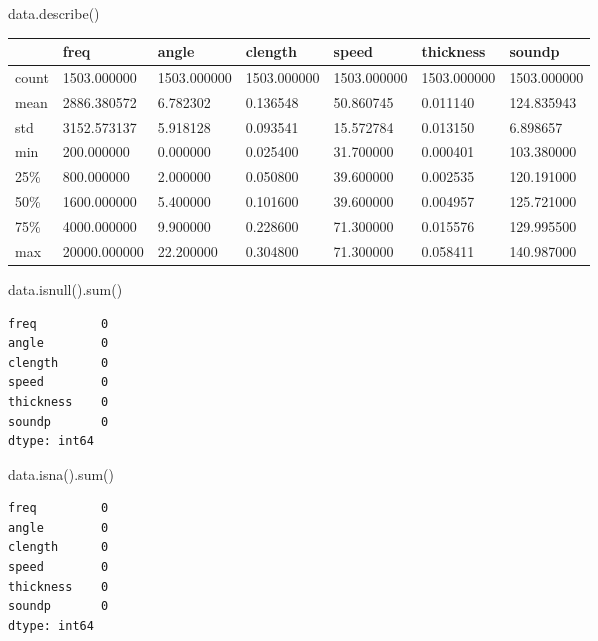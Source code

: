 \documentclass[
  letterpaper,
  DIV=11,
  numbers=noendperiod]{scrartcl}
\newenvironment{Shaded}{\begin{snugshade}}{\end{snugshade}}
\newcommand{\BuiltInTok}[1]{\textcolor[rgb]{0.00,0.23,0.31}{#1}}
\newcommand{\NormalTok}[1]{\textcolor[rgb]{0.00,0.23,0.31}{#1}}
\begin{document}
\begin{Shaded}
\begin{Highlighting}[]
\NormalTok{data.describe()}
\end{Highlighting}
\end{Shaded}

\begin{longtable}[]{@{}lllllll@{}}
\toprule()
& freq & angle & clength & speed & thickness & soundp \\
\midrule()
\endhead
count & 1503.000000 & 1503.000000 & 1503.000000 & 1503.000000 &
1503.000000 & 1503.000000 \\
mean & 2886.380572 & 6.782302 & 0.136548 & 50.860745 & 0.011140 &
124.835943 \\
std & 3152.573137 & 5.918128 & 0.093541 & 15.572784 & 0.013150 &
6.898657 \\
min & 200.000000 & 0.000000 & 0.025400 & 31.700000 & 0.000401 &
103.380000 \\
25\% & 800.000000 & 2.000000 & 0.050800 & 39.600000 & 0.002535 &
120.191000 \\
50\% & 1600.000000 & 5.400000 & 0.101600 & 39.600000 & 0.004957 &
125.721000 \\
75\% & 4000.000000 & 9.900000 & 0.228600 & 71.300000 & 0.015576 &
129.995500 \\
max & 20000.000000 & 22.200000 & 0.304800 & 71.300000 & 0.058411 &
140.987000 \\
\bottomrule()
\end{longtable}

\begin{Shaded}
\begin{Highlighting}[]
\NormalTok{data.isnull().}\BuiltInTok{sum}\NormalTok{()}
\end{Highlighting}
\end{Shaded}

\begin{verbatim}
freq         0
angle        0
clength      0
speed        0
thickness    0
soundp       0
dtype: int64
\end{verbatim}

\begin{Shaded}
\begin{Highlighting}[]
\NormalTok{data.isna().}\BuiltInTok{sum}\NormalTok{()}
\end{Highlighting}
\end{Shaded}

\begin{verbatim}
freq         0
angle        0
clength      0
speed        0
thickness    0
soundp       0
dtype: int64
\end{verbatim}
\end{document}
